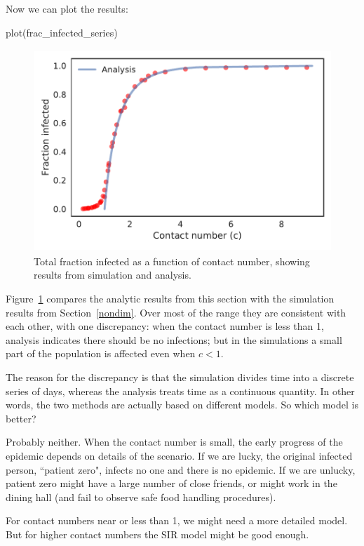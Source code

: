 \documentclass[12pt]{book}
\theoremstyle{exercise}
\begin{document}
Now we can plot the results:

\begin{python}
plot(frac_infected_series)
\end{python}

\begin{figure}
\centerline{\includegraphics[height=3in]{figs/chap06-fig04.pdf}}
\caption{Total fraction infected as a function of contact number, showing results from simulation and analysis.}
\label{chap06-fig04}
\end{figure}

Figure~\ref{chap06-fig04} compares the analytic results from this section with the simulation results from Section~\ref{nondim}.  Over most of the range they are consistent with each other, with one discrepancy: when the contact number is less than 1, analysis indicates there should be no infections; but in the simulations a small part of the population is affected even when $c<1$.

The reason for the discrepancy is that the simulation divides time into a discrete series of days, whereas the analysis treats time as a continuous quantity.  In other words, the two methods are actually based on different models.  So which model is better?

Probably neither.  When the contact number is small, the early progress of the epidemic depends on details of the scenario.  If we are lucky, the original infected person, ``patient zero",  infects no one and there is no epidemic.  If we are unlucky, patient zero might have a large number of close friends, or might work in the dining hall (and fail to observe safe food handling procedures).

For contact numbers near or less than 1, we might need a more detailed model.  But for higher contact numbers the SIR model might be good enough.
\end{document}
